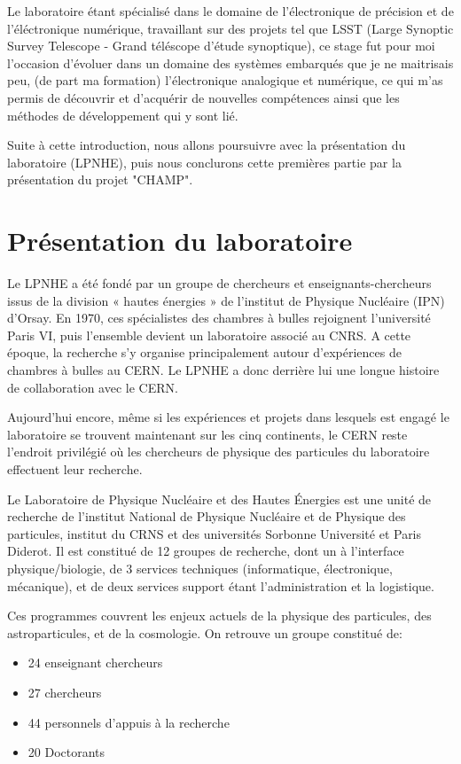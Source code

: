 \documentclass[french,a4paper,12pt]{report}
\begin{document}
Le laboratoire étant spécialisé dans le domaine de l'électronique de précision et de l'éléctronique numérique, travaillant sur des projets tel que LSST (Large Synoptic Survey Telescope - Grand téléscope d'étude synoptique), ce stage fut pour moi l'occasion d'évoluer dans un domaine des systèmes embarqués que je ne maitrisais peu, (de part ma formation) l'électronique analogique et numérique, ce qui m'as permis de découvrir et d'acquérir de nouvelles compétences ainsi que les méthodes de développement qui y sont lié.\newline

Suite à cette introduction, nous allons poursuivre avec la présentation du laboratoire (LPNHE), puis nous conclurons cette premières partie par la présentation du projet "CHAMP".


  
  \chapter{Présentation du laboratoire}
  Le LPNHE a été fondé par un groupe de chercheurs et enseignants-chercheurs issus de la division « hautes énergies » de l’institut de Physique Nucléaire (IPN) d’Orsay. En 1970, ces spécialistes des chambres à bulles rejoignent l’université Paris VI, puis l’ensemble devient un laboratoire associé au CNRS. A cette époque, la recherche s’y organise principalement autour d’expériences de chambres à bulles au CERN. Le LPNHE a donc derrière lui une longue histoire de collaboration avec le CERN.\newline
  
  Aujourd’hui encore, même si les expériences et projets dans lesquels est engagé le laboratoire se trouvent maintenant sur les cinq continents, le CERN reste l’endroit privilégié où les chercheurs de physique des particules du laboratoire effectuent leur recherche.\newline
  
  Le Laboratoire de Physique Nucléaire et des Hautes Énergies est une unité de recherche de l'institut National de Physique Nucléaire et de Physique des particules, institut du CRNS et des universités Sorbonne Université et Paris Diderot. Il est constitué de 12 groupes de recherche, dont un à l’interface physique/biologie, de 3 services techniques (informatique, électronique, mécanique), et de deux services support étant l'administration et la logistique.\newline
  
  Ces programmes couvrent les enjeux actuels de la physique des particules, des astroparticules, et de la cosmologie.
  On retrouve un groupe constitué de:
  \begin{itemize}
  \item  24 enseignant chercheurs
  \item  27 chercheurs
  \item  44 personnels d'appuis à la recherche
  \item  20 Doctorants
  \end{itemize}
  \newpage
  
\end{document}
